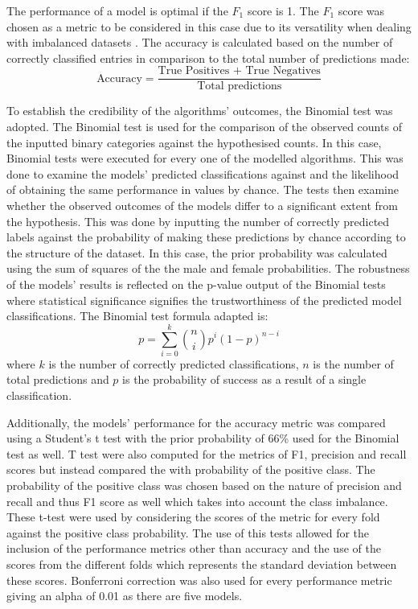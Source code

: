 \documentclass{l4proj}
\begin{document}
The performance of a model is optimal if the $F_1$ score is 1. The $F_1$ score was chosen as a metric to be considered in this case due to its versatility when dealing with imbalanced datasets \citep{kong2019hyperparameter}.
The accuracy is calculated based on the number of correctly classified entries in comparison to the total number of predictions made:
\begin{equation}
    \text{Accuracy} = \frac{\text{True Positives + True Negatives}}{\text{Total predictions}}
\end{equation}


To establish  the credibility of the algorithms’ outcomes, the Binomial test was adopted. The Binomial test is used for the comparison of the observed counts of the inputted binary categories against the hypothesised counts. In this case, Binomial tests were executed for every one of the modelled algorithms. This was done to examine the models' predicted classifications against and the likelihood of obtaining the same performance in values by chance. The tests then examine whether the observed outcomes of the models differ to a significant extent from the hypothesis.
This was done by inputting the number of correctly predicted labels against the probability of making these predictions by chance according to the structure of the dataset. In this case, the prior probability was calculated using the sum of squares of the the male and female probabilities. The robustness of the models' results is reflected on the p-value output of the Binomial tests where statistical significance signifies the trustworthiness of the predicted model classifications.
The Binomial test formula adapted is:
    \begin{equation}
    p= \sum_{i=0}^{k} \binom{n}{i} p^i (1-p)^{n-i}
    \end{equation}
where $k$ is the number of correctly predicted classifications, $n$ is the number of total predictions and $p$ is the probability of success as a result of a single classification.

Additionally, the models' performance for the accuracy metric was compared using a Student's t test with the prior probability of 66\% used for the Binomial test as well. T test were also computed for the metrics of F1, precision and recall scores but instead compared the with probability of the positive class. The probability of the positive class was chosen based on the nature of precision and recall and thus F1 score as well which takes into account the class imbalance.
These t-test were used by considering the scores of the metric for every fold against the positive class probability. The use of this tests allowed for the inclusion of the performance metrics other than accuracy and the use of the scores from the different folds which represents the standard deviation between these scores. Bonferroni correction was also used for every performance metric giving an alpha of 0.01 as there are five models.
\end{document}
